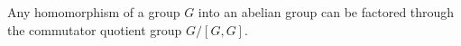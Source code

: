 Any homomorphism of a group $G$ into an abelian group can be factored through the commutator quotient group $G/[G,G]$.
